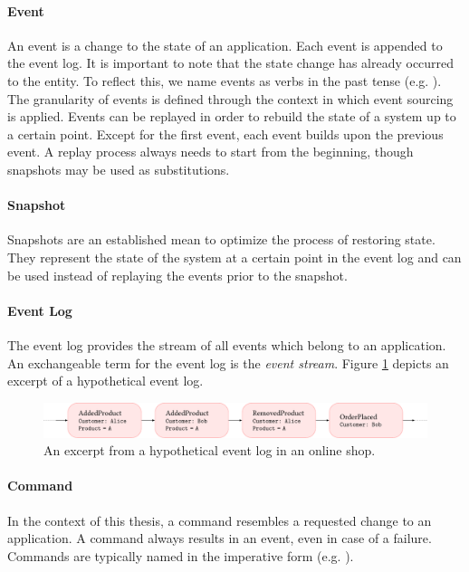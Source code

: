 \paragraph{Event}{
An event is a change to the state of an application. Each event is appended to 
the event log. It is important to note that the state change has already 
occurred to the entity. 
To reflect this, we name events as verbs in the past tense (e.g. ).
The granularity of events is defined through the context in which event sourcing 
is applied.
%
Events can be replayed in order to rebuild the state of a system up to a 
certain point. Except for the first event, each event builds upon the previous 
event. A replay process always needs to start from the beginning, though 
snapshots may be used as substitutions. 
}

\paragraph{Snapshot}
Snapshots are an established mean to optimize the process of restoring state. 
They represent the state of the system at a certain point in the event log 
and can be used instead of replaying the events prior to the snapshot.

\paragraph{Event Log}{
The event log provides the stream of all events which belong to an application.
An exchangeable term for the event log is the \emph{event stream}.
Figure \ref{fig:projections} depicts an excerpt of a hypothetical event log.

\begin{figure}[h!]
	\centering
	\includegraphics[width=1.0\textwidth]
		{../illustrations/projections2.pdf}

	\caption{
		An excerpt from a hypothetical event log in an online shop.
	}
	\label{fig:projections}
\end{figure}
}

\paragraph{Command}{
In the context of this thesis, a command resembles a requested change to an 
application. A command always results in an event, even in case of a failure.
Commands are typically named in the imperative form (e.g. ).
}

